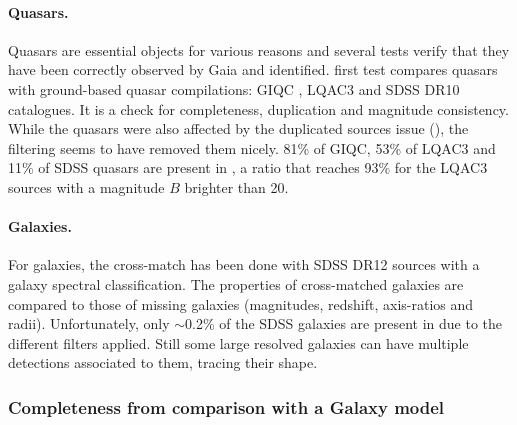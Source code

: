 \paragraph{Quasars.}
Quasars are essential objects for various reasons and several tests verify that they have been correctly observed by Gaia and identified.  first test compares {} quasars with ground-based quasar compilations: GIQC \citep{GIQC}, LQAC3 \citep{2015A&A...583A..75S} and SDSS DR10 \citep{2014A&A...563A..54P} catalogues. It is a check for completeness, duplication and magnitude consistency. 
While the quasars were also affected by the duplicated sources issue (), the filtering seems to have removed them nicely. 
81\% of GIQC, 53\% of LQAC3 and 11\% of SDSS quasars are present in , a ratio that reaches 93\% for the LQAC3 sources with a magnitude $B$ brighter than 20. 

\paragraph{Galaxies.} For galaxies, the cross-match has been done with SDSS DR12 \citep{2015ApJS..219...12A} sources with a galaxy spectral classification. The properties of cross-matched galaxies are compared to those of missing galaxies (magnitudes, redshift, axis-ratios and radii). Unfortunately, only $\sim$0.2\% of the SDSS galaxies are present in {} due to the different filters applied. Still some large resolved galaxies can have multiple detections associated to them, tracing their shape. 

\subsubsection{Completeness from comparison with a Galaxy model}

